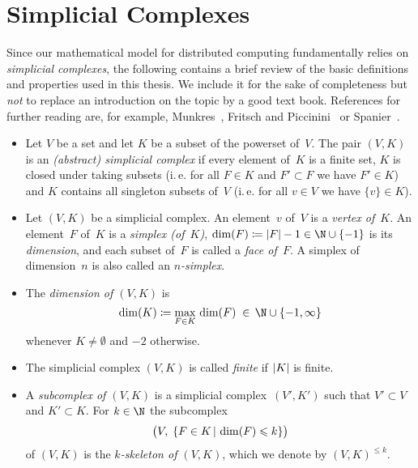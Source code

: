 \section{Simplicial Complexes}
Since our mathematical model for distributed computing fundamentally relies on
\emph{simplicial complexes}, the following contains a brief review of the basic
definitions and properties used in this thesis. We include it for the sake of
completeness but \emph{not} to replace an introduction on the topic by a good
text book. References for further reading are, for example,
Munkres~\cite[\S1\,ff. and \S14\,ff.]{bookc:munkres84},
Fritsch and Piccinini~\cite[Ch.~3]{bookc:fritschpiccinini90}
or Spanier~\cite[Ch.~3]{bookc:spanier66}.
 
\begin{thDef}\hfill
    \begin{itemize}
        \item
            Let $V$ be a set and let $K$ be a subset of the powerset of~$V$.
            The pair $(V,K)$ is an \emph{(abstract) simplicial complex} if every
            element of~$K$ is a finite set, $K$ is closed under taking subsets
            (i.\,e. for all $F\in K$ and $F'\subset F$ we have $F'\in K$) and
            $K$ contains all singleton subsets of~$V$ (i.\,e. for all $v\in V$
            we have $\{v\}\in K$).
            
        \item
            Let $(V,K)$ be a simplicial complex. An element~$v$ of~$V$ is
            a \emph{vertex of~$K$}. An element~$F$ of~$K$ is
            a \emph{simplex (of~$K$)}, $\dim(F)\defeq\abs{F}-1
            \in\N\cup\{-1\}$ is its \emph{dimension}, and each subset of~$F$ is
            called a \emph{face of~$F$}. A simplex of dimension~$n$ is also
            called an \emph{$n$-simplex}.
            
        \item
            The \emph{dimension of $(V,K)$} is
            \[ \dim(K) \defeq \max_{F\in K} \,\dim(F) \;\in\,\N\cup\{-1,\infty\}
            \]
            whenever $K\neq\emptyset$ and $-2$ otherwise.
            
\pagebreak[2]
        \item
            The simplicial complex $(V,K)$ is called \emph{finite} if
            $\abs{K}$ is finite.
            
        \item
            A \emph{subcomplex of $(V,K)$} is a simplicial complex~$(V',K')$
            such that $V'\subset V$ and $K'\subset K$. For $k\in\N$ the
            subcomplex
            \[ \bigl( V,\; \{ F\in K \cMid[\,]{} \dim(F) \leq k \} \bigr) \]
            of $(V,K)$ is the \emph{$k$-skeleton of $(V,K)$}, which
            we denote by $(V,K)^{\leq k}$.
            

\end{itemize}
\end{thDef}
